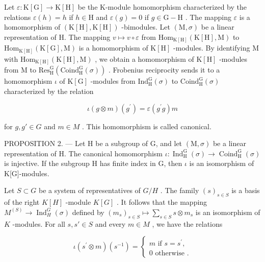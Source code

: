 Let \(\varepsilon : \mathrm{K}[\mathrm{G}] \to \mathrm{K}[\mathrm{H}]\) be the K-module homomorphism characterized by the relations \(\varepsilon(h) = h\) if \(h \in \mathrm{H}\) and \(\varepsilon(g) = 0\) if \(g \in \mathrm{G} - \mathrm{H}\) . The mapping \(\varepsilon\) is a homomorphism of \((\mathrm{K}[\mathrm{H}], \mathrm{K}[\mathrm{H}])\) -bimodules. Let \((\mathrm{M}, \sigma)\) be a linear representation of H. The mapping \(v \mapsto v \circ \varepsilon\) from \(\mathrm{Hom}_{\mathrm{K}[\mathrm{H}]}(\mathrm{K}[\mathrm{H}], \mathrm{M})\) to \(\mathrm{Hom}_{\mathrm{K}[\mathrm{H}]}(\mathrm{K}[\mathrm{G}], \mathrm{M})\) is a homomorphism of \(\mathrm{K}[\mathrm{H}]\) -modules. By identifying M with \(\mathrm{Hom}_{\mathrm{K}[\mathrm{H}]}(\mathrm{K}[\mathrm{H}], \mathrm{M})\) , we obtain a homomorphism of \(\mathrm{K}[\mathrm{H}]\) -modules from M to \(\mathrm{Res}_{\mathrm{H}}^{\mathrm{G}}(\mathrm{Coind}_{\mathrm{H}}^{\mathrm{G}}(\sigma))\) . Frobenius reciprocity sends it to a homomorphism \(\iota\) of \(\mathrm{K}[\mathrm{G}]\) -modules from \(\mathrm{Ind}_{\mathrm{H}}^{\mathrm{G}}(\sigma)\) to \(\mathrm{Coind}_{\mathrm{H}}^{\mathrm{G}}(\sigma)\) characterized by the relation

\[
\iota (g \otimes m) (g ^ {\prime}) = \varepsilon (g ^ {\prime} g) m
\]

for \(g, g' \in G\) and \(m \in M\) . This homomorphism is called canonical.

PROPOSITION 2. --- Let H be a subgroup of G, and let \((\mathrm{M},\sigma)\) be a linear representation of H. The canonical homomorphism \(\iota:\operatorname{Ind}_{\mathrm{H}}^{\mathrm{G}}(\sigma)\to\operatorname{Coind}_{\mathrm{H}}^{\mathrm{G}}(\sigma)\) is injective. If the subgroup H has finite index in G, then \(\iota\) is an isomorphism of K{[}G{]}-modules.

Let \(S \subset G\) be a system of representatives of \(G/H\) . The family \((s)_{s \in S}\) is a basis of the right \(K[H]\) -module \(K[G]\) . It follows that the mapping \(M^{(S)} \to \operatorname{Ind}_{H}^{G}(\sigma)\) defined by \((m_s)_{s \in S} \mapsto \sum_{s \in S} s \otimes m_s\) is an isomorphism of \(K\) -modules. For all \(s, s' \in S\) and every \(m \in M\) , we have the relations

\[
\iota (s ^ {\prime} \otimes m) (s ^ {- 1}) = \left\{ \begin{array}{l} m \text {   if   } s = s ^ {\prime}, \\ 0 \text {   otherwise }. \end{array} \right.
\]

